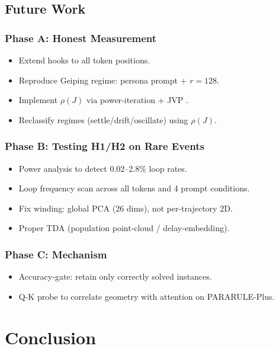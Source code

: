 \subsection{Future Work}

\subsubsection{Phase A: Honest Measurement}
\begin{itemize}
    \item Extend hooks to all token positions.
    \item Reproduce Geiping regime: persona prompt + $r=128$.
    \item Implement $\rho(J)$ via power-iteration + JVP \cite{yang2025stabilizing}.
    \item Reclassify regimes (settle/drift/oscillate) using $\rho(J)$.
\end{itemize}

\subsubsection{Phase B: Testing H1/H2 on Rare Events}
\begin{itemize}
    \item Power analysis to detect 0.02--2.8\% loop rates.
    \item Loop frequency scan across all tokens and 4 prompt conditions.
    \item Fix winding: global PCA (26 dims), not per-trajectory 2D.
    \item Proper TDA (population point-cloud / delay-embedding).
\end{itemize}

\subsubsection{Phase C: Mechanism}
\begin{itemize}
    \item Accuracy-gate: retain only correctly solved instances.
    \item Q-K probe \cite{tulchinskii2025quantifying} to correlate geometry with attention on PARARULE-Plus.
\end{itemize}

\section{Conclusion}

